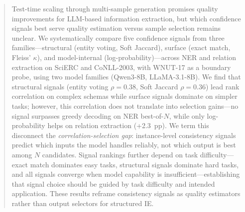 \begin{abstract}
Test-time scaling through multi-sample generation promises quality improvements for LLM-based information extraction, but which confidence signals best serve quality estimation versus sample selection remains unclear.
We systematically compare five confidence signals from three families---structural (entity voting, Soft Jaccard), surface (exact match, Fleiss' $\kappa$), and model-internal (log-probability)---across NER and relation extraction on SciERC and CoNLL-2003, with WNUT-17 as a boundary probe, using two model families (Qwen3-8B, LLaMA-3.1-8B).
We find that structural signals (entity voting $\rho{=}0.38$, Soft Jaccard $\rho{=}0.36$) lead rank correlation on complex schemas while surface signals dominate on simpler tasks; however, this correlation does not translate into selection gains---no signal surpasses greedy decoding on NER best-of-$N$, while only log-probability helps on relation extraction (+2.3~pp).
We term this disconnect the \textit{correlation-selection gap}: instance-level consistency signals predict which inputs the model handles reliably, not which output is best among $N$ candidates.
Signal rankings further depend on task difficulty---exact match dominates easy tasks, structural signals dominate hard tasks, and all signals converge when model capability is insufficient---establishing that signal choice should be guided by task difficulty and intended application.
These results reframe consistency signals as quality estimators rather than output selectors for structured IE.
\end{abstract}
